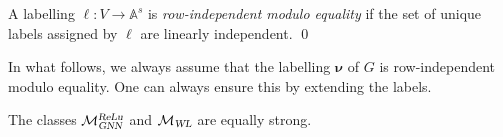 \begin{definition}\label{def:label2}\normalfont
	A labelling $\pmb{\ell}:V\to\mathbb{A}^s$ is \textit{row-independent modulo equality} if the set of unique labels assigned by $\pmb{\ell}$ are linearly independent. \qed
\end{definition}
In what follows, we always assume that the labelling $\pmb{\nu}$ of $G$ is row-independent modulo equality. One can always ensure this by extending the labels.
%
\begin{proposition}
The classes $\mathcal{M}_{\textsl{GNN}}^{\textsl{ReLu}}$ and  $\mathcal{M}_{\textsl{WL}}$ are equally strong.
\end{proposition}
